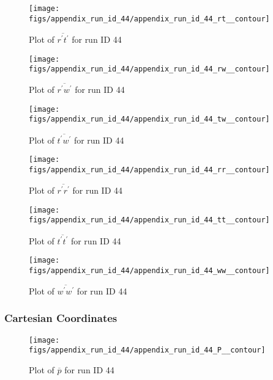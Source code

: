 \begin{figure}[H]
\centering
\texttt{[image: figs/appendix\_run\_id\_44/appendix\_run\_id\_44\_rt\_\_contour]}
\caption{Plot of $\overline{r^\prime t^\prime}$ for run ID 44}
\label{fig:appendix_run_id_44_rt__contour}
\end{figure}


\begin{figure}[H]
\centering
\texttt{[image: figs/appendix\_run\_id\_44/appendix\_run\_id\_44\_rw\_\_contour]}
\caption{Plot of $\overline{r^\prime w^\prime}$ for run ID 44}
\label{fig:appendix_run_id_44_rw__contour}
\end{figure}


\begin{figure}[H]
\centering
\texttt{[image: figs/appendix\_run\_id\_44/appendix\_run\_id\_44\_tw\_\_contour]}
\caption{Plot of $\overline{t^\prime w^\prime}$ for run ID 44}
\label{fig:appendix_run_id_44_tw__contour}
\end{figure}


\begin{figure}[H]
\centering
\texttt{[image: figs/appendix\_run\_id\_44/appendix\_run\_id\_44\_rr\_\_contour]}
\caption{Plot of $\overline{r^\prime r^\prime}$ for run ID 44}
\label{fig:appendix_run_id_44_rr__contour}
\end{figure}


\begin{figure}[H]
\centering
\texttt{[image: figs/appendix\_run\_id\_44/appendix\_run\_id\_44\_tt\_\_contour]}
\caption{Plot of $\overline{t^\prime t^\prime}$ for run ID 44}
\label{fig:appendix_run_id_44_tt__contour}
\end{figure}


\begin{figure}[H]
\centering
\texttt{[image: figs/appendix\_run\_id\_44/appendix\_run\_id\_44\_ww\_\_contour]}
\caption{Plot of $\overline{w^\prime w^\prime}$ for run ID 44}
\label{fig:appendix_run_id_44_ww__contour}
\end{figure}


\subsubsection{Cartesian Coordinates}
\begin{figure}[H]
\centering
\texttt{[image: figs/appendix\_run\_id\_44/appendix\_run\_id\_44\_P\_\_contour]}
\caption{Plot of $\overline{p}$ for run ID 44}
\label{fig:appendix_run_id_44_P__contour}
\end{figure}


